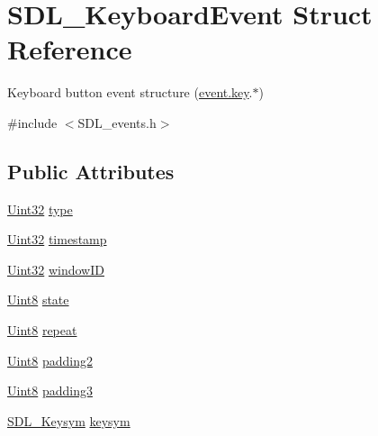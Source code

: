 \hypertarget{struct_s_d_l___keyboard_event}{}\section{S\+D\+L\+\_\+\+Keyboard\+Event Struct Reference}
\label{struct_s_d_l___keyboard_event}


Keyboard button event structure (\hyperlink{union_s_d_l___event_ab99927835cc77a9b6bb50b419b4a27df}{event.\+key}.$\ast$)  




{\ttfamily \#include $<$S\+D\+L\+\_\+events.\+h$>$}

\subsection*{Public Attributes}
\begin{DoxyCompactItemize}
\item 
\hyperlink{_s_d_l__stdinc_8h_add440eff171ea5f55cb00c4a9ab8672d}{Uint32} \hyperlink{struct_s_d_l___keyboard_event_ae0b2f2aace6f80c1f47e5a14350d409a}{type}
\item 
\hyperlink{_s_d_l__stdinc_8h_add440eff171ea5f55cb00c4a9ab8672d}{Uint32} \hyperlink{struct_s_d_l___keyboard_event_a3da1d8f6892e7f6ee28d9eafdb5e7d02}{timestamp}
\item 
\hyperlink{_s_d_l__stdinc_8h_add440eff171ea5f55cb00c4a9ab8672d}{Uint32} \hyperlink{struct_s_d_l___keyboard_event_a56efb6780b96acd5b50d8f797efb3546}{window\+ID}
\item 
\hyperlink{_s_d_l__stdinc_8h_a2944638813a090aa23e62f4da842c3e2}{Uint8} \hyperlink{struct_s_d_l___keyboard_event_a110558eb96c113c86cfa31a7018c2346}{state}
\item 
\hyperlink{_s_d_l__stdinc_8h_a2944638813a090aa23e62f4da842c3e2}{Uint8} \hyperlink{struct_s_d_l___keyboard_event_a3edac3b36304812d533795c9df4ed4c1}{repeat}
\item 
\hyperlink{_s_d_l__stdinc_8h_a2944638813a090aa23e62f4da842c3e2}{Uint8} \hyperlink{struct_s_d_l___keyboard_event_ae270122f757f76171318294afd2c95e6}{padding2}
\item 
\hyperlink{_s_d_l__stdinc_8h_a2944638813a090aa23e62f4da842c3e2}{Uint8} \hyperlink{struct_s_d_l___keyboard_event_ae1831035ef556a7b09efcd2469f26f7a}{padding3}
\item 
\hyperlink{struct_s_d_l___keysym}{S\+D\+L\+\_\+\+Keysym} \hyperlink{struct_s_d_l___keyboard_event_a2a57ba820a298f2c02ad5d41fd2b1aa8}{keysym}
\end{DoxyCompactItemize}


